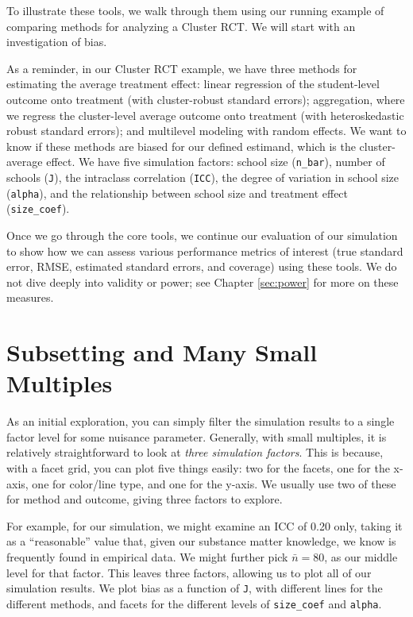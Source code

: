 \documentclass[
]{book}
\begin{document}
To illustrate these tools, we walk through them using our running example of comparing methods for analyzing a Cluster RCT.
We will start with an investigation of bias.

As a reminder, in our Cluster RCT example, we have three methods for estimating the average treatment effect: linear regression of the student-level outcome onto treatment (with cluster-robust standard errors); aggregation, where we regress the cluster-level average outcome onto treatment (with heteroskedastic robust standard errors); and multilevel modeling with random effects.
We want to know if these methods are biased for our defined estimand, which is the cluster-average effect.
We have five simulation factors: school size (\texttt{n\_bar}), number of schools (\texttt{J}), the intraclass correlation (\texttt{ICC}), the degree of variation in school size (\texttt{alpha}), and the relationship between school size and treatment effect (\texttt{size\_coef}).

Once we go through the core tools, we continue our evaluation of our simulation to show how we can assess various performance metrics of interest (true standard error, RMSE, estimated standard errors, and coverage) using these tools.
We do not dive deeply into validity or power; see Chapter \ref{sec:power} for more on these measures.

\section{Subsetting and Many Small Multiples}\label{subsetting-and-many-small-multiples}

As an initial exploration, you can simply filter the simulation results to a single factor level for some nuisance parameter.
Generally, with small multiples, it is relatively straightforward to look at \emph{three simulation factors}.
This is because, with a facet grid, you can plot five things easily: two for the facets, one for the x-axis, one for color/line type, and one for the y-axis.
We usually use two of these for method and outcome, giving three factors to explore.

For example, for our simulation, we might examine an ICC of 0.20 only, taking it as a ``reasonable'' value that, given our substance matter knowledge, we know is frequently found in empirical data.
We might further pick \(\bar{n} = 80\), as our middle level for that factor.
This leaves three factors, allowing us to plot all of our simulation results.
We plot bias as a function of \texttt{J}, with different lines for the different methods, and facets for the different levels of \texttt{size\_coef} and \texttt{alpha}.
\end{document}
